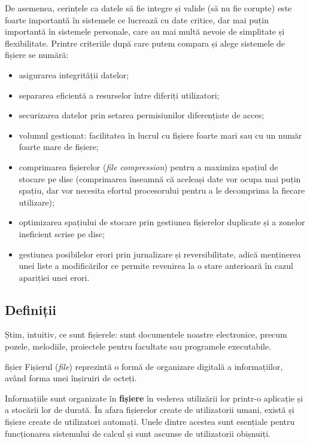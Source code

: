 De asemenea, cerințele ca datele să fie integre și valide (să nu fie corupte) este foarte importantă în sistemele ce lucrează cu date critice, dar mai puțin importantă în sistemele personale, care au mai multă nevoie de simplitate și flexibilitate. Printre criteriile după care putem compara și alege sistemele de fișiere se numără:

\begin{itemize}
  \item asigurarea integrității datelor;
  \item separarea eficientă a resurselor între diferiți utilizatori;
  \item securizarea datelor prin setarea permisiunilor diferențiate de acces;
  \item volumul gestionat: facilitatea în lucrul cu fișiere foarte mari sau cu un număr foarte mare de fișiere;
  \item comprimarea fișierelor (\textit{file compression}) pentru a maximiza spațiul de stocare pe disc (comprimarea înseamnă că aceleași date vor ocupa mai puțin spațiu, dar vor necesita efortul procesorului pentru a le decomprima la fiecare utilizare);
  \item optimizarea spațiului de stocare prin gestiunea fișierelor duplicate și a zonelor ineficient scrise pe disc;
  \item gestiunea posibilelor erori prin jurnalizare și reversibilitate, adică menținerea unei liste a modificărilor ce permite revenirea la o stare anterioară în cazul apariției unei erori.
\end{itemize}

\subsection{Definiții}
\label{sec:fs:defs}

Știm, intuitiv, ce sunt fișierele: sunt documentele noastre electronice, precum pozele, melodiile, proiectele pentru facultate sau programele executabile.

\begin{definition}{fișier}
Fișierul (\textit{file}) reprezintă o formă de organizare digitală a informațiilor, având forma unei înșiruiri de octeți.
\end{definition}

Informațiile sunt organizate în \textbf{fișiere} în vederea utilizării lor printr-o aplicație și a stocării lor de durată. În afara fișierelor create de utilizatorii umani, există și fișiere create de utilizatori automați. Unele dintre acestea sunt esențiale pentru funcționarea sistemului de calcul și sunt ascunse de utilizatorii obișnuiți.


